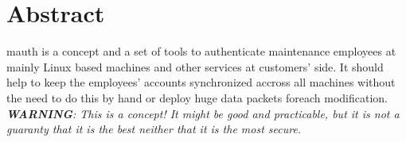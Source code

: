 %
%
%
%
%
%
%


\section*{Abstract}

mauth is a concept and a set of tools to authenticate maintenance employees at
mainly Linux based machines and other services at customers' side. It should
help to keep the employees' accounts synchronized accross all machines without
the need to do this by hand or deploy huge data packets foreach modification. \\

\textit{\textbf{WARNING}: This is a concept! It might be good and practicable,
but it is not a guaranty that it is the best neither that it is the most
secure.}

